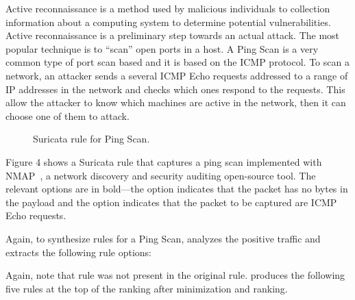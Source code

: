 \documentclass[sigconf,anonymous]{acmart}
\begin{document}
Active reconnaissance is a method used by malicious individuals to
collection information about a computing system to determine potential
vulnerabilities. Active reconnaissance is a preliminary step towards
an actual attack. The most popular technique is to ``scan'' open ports
in a host. A Ping Scan is a very common type of port scan based and it
is based on the ICMP protocol. 
   To scan a network, an attacker sends a several
ICMP Echo requests addressed to a range of IP addresses in the network
and checks which ones respond to the requests. This allow the attacker
to know which machines are active in the network, then it can choose
one of them to attack.

\begin{figure}[h!]
  
  \caption{Suricata rule for Ping Scan.}
  \label{fig:synflood-example}
\end{figure}

Figure 4 shows a Suricata rule that captures a ping scan implemented
with NMAP~\cite{netmap}, a network discovery and security auditing
open-source tool. The relevant options are in bold---the option
 indicates that the packet has no bytes in the
payload and the option  indicates that the packet to
be captured are ICMP Echo requests.

Again, to synthesize rules for a Ping Scan, \tname{} analyzes the
positive traffic and extracts the following rule options:


\begin{figure}[h]
  \vspace{-2ex}
  
  \vspace{-3ex}  
\end{figure}


Again, note that rule  was not present in the original
rule.  \tname{} produces the following five rules at the top of the
ranking after minimization and ranking.
\end{document}

